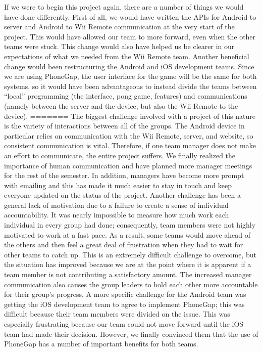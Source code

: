 \documentclass[12pt]{article}
\begin{document}
\begin{itemize}
If we were to begin this project again, there are a number of things we would have done differently.  First of all, we would have written the APIs for Android to server and Android to Wii Remote communication at the very start of the project.  This would have allowed our team to more forward, even when the other teams were stuck.  This change would also have helped us be clearer in our expectations of what we needed from the Wii Remote team.  Another beneficial change would been restructuring the Android and iOS development teams.  Since we are using PhoneGap, the user interface for the game will be the same for both systems, so it would have been advantageous to instead divide the teams between “local” programming (the interface, pong game, features) and communications (namely between the server and the device, but also the Wii Remote to the device). 
=======
The biggest challenge involved with a project of this nature is the variety of interactions between all of the groups.  The Android device in particular relies on communication with the Wii Remote, server, and website, so consistent communication is vital.  Therefore, if one team manager does not make an effort to communicate, the entire project suffers.  We finally realized the importance of human communication and have planned more manager meetings for the rest of the semester.  In addition, managers have become more prompt with emailing and this has made it much easier to stay in touch and keep everyone updated on the status of the project.  Another challenge has been a general lack of motivation due to a failure to create a sense of individual accountability.  It was nearly impossible to measure how much work each individual in every group had done; consequently, team members were not highly motivated to work at a fast pace.  As a result, some teams would move ahead of the others and then feel a great deal of frustration when they had to wait for other teams to catch up.  This is an extremely difficult challenge to overcome, but the situation has improved because we are at the point where it is apparent if a team member is not contributing a satisfactory amount.  The increased manager communication also causes the group leaders to hold each other more accountable for their group’s progress.  A more specific challenge for the Android team was getting the iOS development team to agree to implement PhoneGap; this was difficult because their team members were divided on the issue.  This was especially frustrating because our team could not move forward until the iOS team had made their decision.  However, we finally convinced them that the use of PhoneGap has a number of important benefits for both teams.


\end{itemize}
\end{document}
